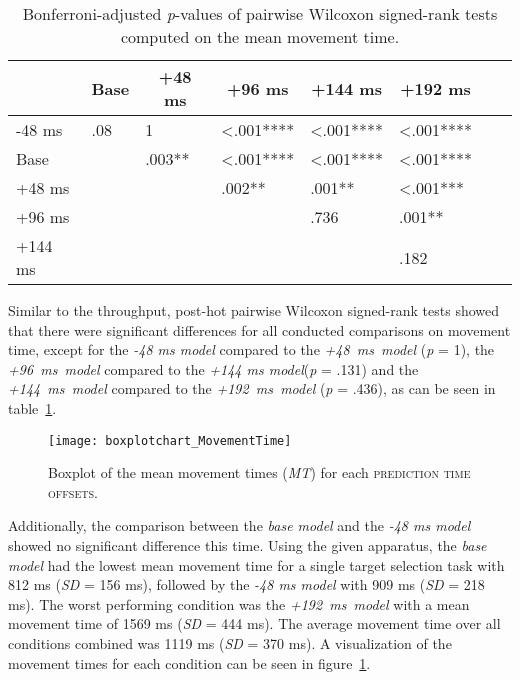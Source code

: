 \documentclass[sigconf]{acmart}
\begin{document}
\begin{table}
\caption{Bonferroni-adjusted \textit{p}-values of pairwise Wilcoxon signed-rank tests computed on the mean movement time.}
\label{table:mt_p}
\begin{tabular}{llllllll}
\toprule
         	& \multicolumn{1}{c}{Base}  & \multicolumn{1}{c}{+48 ms} 	& \multicolumn{1}{c}{+96 ms} 	& \multicolumn{1}{c}{+144 ms} 	& \multicolumn{1}{c}{+192 ms} 	\\ \midrule
-48 ms   	& \phantom{<}.08				& 1			    				& <.001****  					& <.001**** 						& <.001**** 						\\
Base     	&       						& \phantom{<}.003** 			& <.001**** 					& <.001**** 						& <.001**** 						\\
+48 ms  	&       						&        						& \phantom{<}.002** 			& \phantom{<}.001** 				& <.001***   					\\
+96 ms  	&       						&        						&            					& \phantom{<}.736				& \phantom{<}.001**     			\\
+144 ms 	&       						&        						&            					&            					& \phantom{<}.182      			\\ \bottomrule
\end{tabular}

\end{table}

Similar to the throughput, post-hot pairwise Wilcoxon signed-rank tests showed that there were significant differences for all conducted comparisons on movement time, except for the \textit{-48 ms model} compared to the \mbox{\textit{+48 ms model}} (\textit{p} = 1), the \mbox{\textit{+96 ms model}} compared to the \textit{+144 ms model}(\textit{p} = .131) and the \mbox{\textit{+144 ms model}} compared to the \mbox{\textit{+192 ms model}} (\textit{p} = .436), as can be seen in table~\ref{table:mt_p}.

\begin{figure}[H]
  \centering
  \texttt{[image: boxplotchart\_MovementTime]}
  \caption{Boxplot of the mean movement times (\textit{MT}) for each \textsc{prediction time offsets}.}
 \label{fig:bp_movementtimes}
\end{figure}

Additionally, the comparison between the \textit{base model} and the \textit{-48 ms model} showed no significant difference this time. Using the given apparatus, the \textit{base model} had the lowest mean movement time for a single target selection task with 812 ms (\textit{SD} = 156 ms), followed by the \textit{-48 ms model} with 909 ms (\textit{SD} = 218 ms). The worst performing condition was the \mbox{\textit{+192 ms model}} with a mean movement time of 1569 ms (\textit{SD} = 444 ms). The average movement time over all conditions combined was 1119 ms (\textit{SD} = 370 ms). A visualization of the movement times for each condition can be seen in figure~\ref{fig:bp_movementtimes}.
\end{document}
